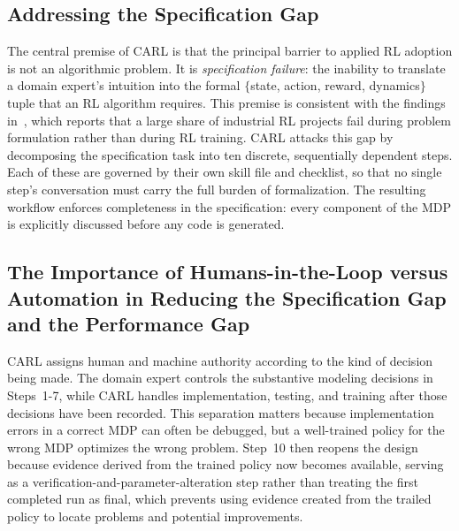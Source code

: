 \documentclass[mnsc,sglanonrev]{informs4}
\begin{document}
\subsection{Addressing the Specification Gap}

The central premise of CARL is that the principal barrier to applied RL adoption is not an algorithmic problem. It is \emph{specification failure}: the inability to translate a domain expert's intuition into the formal $\{$state, action, reward, dynamics$\}$ tuple that an RL algorithm requires. This premise is consistent with the findings in~\cite{hamadanian_how_2022}, which reports that a large share of industrial RL projects fail during problem formulation rather than during RL training. CARL attacks this gap by decomposing the specification task into ten discrete, sequentially dependent steps. Each of these are governed by their own skill file and checklist, so that no single step's conversation must carry the full burden of formalization. The resulting workflow enforces completeness in the specification: every component of the MDP is explicitly discussed before any code is generated.


\subsection{The Importance of Humans-in-the-Loop versus Automation in Reducing the Specification Gap and the Performance Gap}

CARL assigns human and machine authority according to the kind of decision being made. The domain expert controls the substantive modeling decisions in Steps~1-7, while CARL handles implementation, testing, and training after those decisions have been recorded. This separation matters because implementation errors in a correct MDP can often be debugged, but a well-trained policy for the wrong MDP optimizes the wrong problem. Step~10 then reopens the design because evidence derived from the trained policy now becomes available, serving as a verification-and-parameter-alteration step rather than treating the first completed run as final, which prevents using evidence created from the trailed policy to locate problems and potential improvements.
\end{document}
